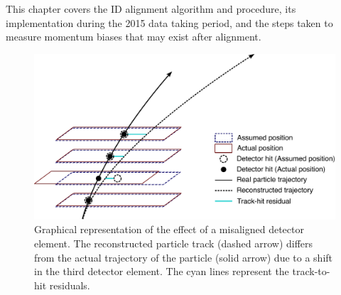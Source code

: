This chapter covers the ID alignment algorithm and procedure, its implementation during the 2015 data taking period, and the steps taken to measure momentum biases that may exist after alignment.  

\begin{figure}[htbp]
  \centering
  \includegraphics[width=.8\textwidth]{figs/alignment/misalignment}
  \caption{Graphical representation of the effect of a misaligned detector element.  The reconstructed particle track (dashed arrow) differs from the actual trajectory of the particle (solid arrow) due to a shift in the third detector element.  The cyan lines represent the track-to-hit residuals.}
  \label{fig:alignment_effects_misalign}
\end{figure}


%

